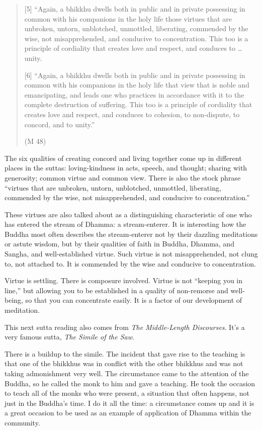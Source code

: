 \begin{quotation}
{[}5{]} “Again, a bhikkhu dwells both in public and in private
possessing in common with his companions in the holy life those virtues
that are unbroken, untorn, unblotched, unmottled, liberating, commended
by the wise, not misapprehended, and conducive to concentration. This
too is a principle of cordiality that creates love and respect, and
conduces to \ldots{} unity.

{[}6{]} “Again, a bhikkhu dwells both in public and in private
possessing in common with his companions in the holy life that view that
is noble and emancipating, and leads one who practices in accordance
with it to the complete destruction of suffering. This too is a
principle of cordiality that creates love and respect, and conduces to
cohesion, to non-dispute, to concord, and to unity.”

\hfill(M 48)
\end{quotation}

The six qualities of creating concord and living together come up in
different places in the suttas: loving-kindness in acts, speech, and
thought; sharing with generosity; common virtue and common view. There
is also the stock phrase “virtues that are unbroken, untorn, unblotched,
unmottled, liberating, commended by the wise, not misapprehended, and
conducive to concentration.”

These virtues are also talked about as a distinguishing characteristic
of one who has entered the stream of Dhamma: a stream-enterer. It is
interesting how the Buddha most often describes the stream-enterer not
by their dazzling meditations or astute wisdom, but by their qualities
of faith in Buddha, Dhamma, and Sangha, and well-established virtue.
Such virtue is not misapprehended, not clung to, not attached to. It is
commended by the wise and conducive to concentration.

Virtue is settling. There is composure involved. Virtue is not “keeping
you in line,” but allowing you to be established in a quality of
non-remorse and well-being, so that you can concentrate easily. It is a
factor of our development of meditation.

This next sutta reading also comes from \emph{The Middle-Length
Discourses}. It’s a very famous sutta, \emph{The Simile of the Saw}.

There is a buildup to the simile. The incident that gave rise to the
teaching is that one of the bhikkhus was in conflict with the other
bhikkhus and was not taking admonishment very well. The circumstance
came to the attention of the Buddha, so he called the monk to him and
gave a teaching. He took the occasion to teach all of the monks who were
present, a situation that often happens, not just in the Buddha’s time.
I do it all the time: a circumstance comes up and it is a great occasion
to be used as an example of application of Dhamma within the community.

